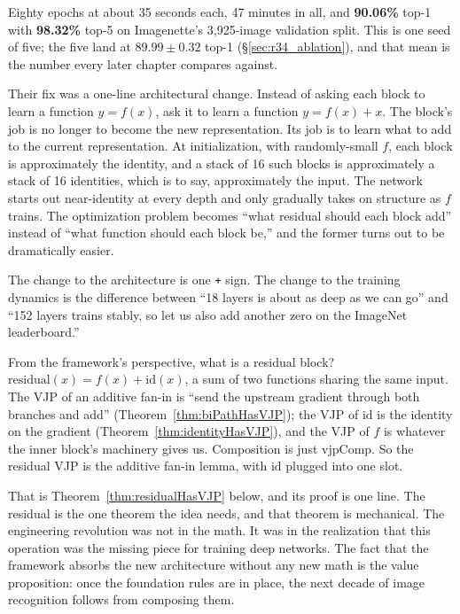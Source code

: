 Eighty epochs at about 35 seconds each, 47 minutes in all, and
\textbf{90.06\%} top-1 with \textbf{98.32\%} top-5 on Imagenette's 3,925-image
validation split. This is one seed of five; the five land at
$89.99 \pm 0.32$ top-1 (\S\ref{sec:r34_ablation}), and that mean is the
number every later chapter compares against.


Their fix was a one-line architectural change. Instead of asking
each block to learn a function \(y = f(x)\), ask it to learn a
function \(y = f(x) + x\). The block's job is no longer to
become the new representation. Its job is to learn what to
add to the current representation. At initialization, with
randomly-small \(f\), each block is approximately the identity,
and a stack of 16 such blocks is approximately a stack of
16 identities, which is to say, approximately the input. The
network starts out near-identity at every depth and only gradually
takes on structure as \(f\) trains. The optimization problem
becomes ``what residual should each block add'' instead of ``what
function should each block be,'' and the former turns out to be
dramatically easier.

The change to the architecture is one \texttt{+} sign. The change
to the training dynamics is the difference between ``18 layers is
about as deep as we can go'' and ``152 layers trains stably, so let
us also add another zero on the ImageNet leaderboard.''


From the framework's perspective, what is a residual block?
\(\mathrm{residual}(x) = f(x) + \mathrm{id}(x)\), a sum of two
functions sharing the same input. The VJP of an additive fan-in is ``send the upstream gradient through
both branches and add'' (Theorem~\ref{thm:biPathHasVJP}); the VJP of
\(\mathrm{id}\) is the identity on the gradient
(Theorem~\ref{thm:identityHasVJP}), and the VJP of \(f\) is whatever the
inner block's machinery gives us. Composition is just
\(\mathrm{vjpComp}\). So the residual VJP is the additive
fan-in lemma, with \(\mathrm{id}\) plugged into one slot.

That is Theorem~\ref{thm:residualHasVJP} below, and its proof
is one line. The residual is the one theorem the idea needs, and
that theorem is mechanical. The engineering revolution was not
in the math. It was in the realization that this
operation was the missing piece for training deep
networks. The fact that the framework absorbs the new
architecture without any new math is the value proposition: once
the foundation rules are in place, the next decade of image
recognition follows from composing them.

